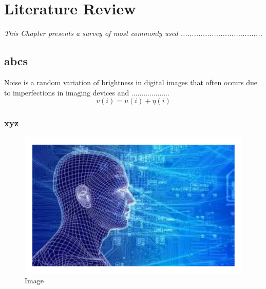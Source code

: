 \chapter{Literature Review}
\label{C2} %
\graphicspath{{Figures/Chapter-2figs/PDF/}{Figures/Chapter-2figs/}}
\textit{This Chapter presents a survey of most commonly used .....................................}
\section{abcs} \label{S2.1}
Noise is a random variation of brightness in digital images that often occurs due to imperfections in imaging devices and
................... \cite{whygaussianity} 
\begin{equation}
	v(i)=u(i)+\eta(i) \label{e2.1}
\end{equation}	
\subsection{xyz} \label{SS2.1}

\begin{figure}[b!]
	\center	
	\includegraphics[scale=0.62]{fig2_1} 	
	\caption{Image} \label{f2.1}
\end{figure}
